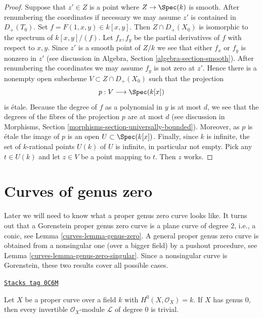 \begin{proof}
Suppose that $z' \in Z$ is a point where $Z \to \Spec(k)$ is smooth.
After renumbering the coordinates if necessary we may assume
$z'$ is contained in $D_+(T_0)$. Set $f = F(1, x, y) \in k[x, y]$.
Then $Z \cap D_+(X_0)$ is isomorphic to the spectrum of $k[x, y]/(f)$.
Let $f_x, f_y$ be the partial derivatives of $f$ with respect to
$x, y$. Since $z'$ is a smooth point of $Z/k$ we see that either
$f_x$ or $f_y$ is nonzero in $z'$ (see discussion in
Algebra, Section \ref{algebra-section-smooth}).
After renumbering the coordinates
we may assume $f_y$ is not zero at $z'$. Hence there is a nonempty
open subscheme $V \subset Z \cap D_{+}(X_0)$ such that the
projection
$$
p : V \longrightarrow \Spec(k[x])
$$
is \'etale. Because the degree of $f$ as a polynomial in $y$
is at most $d$, we see that the degrees of the fibres of the
projection $p$ are at most $d$ (see discussion in
Morphisms, Section \ref{morphisms-section-universally-bounded}).
Moreover, as $p$ is \'etale
the image of $p$ is an open $U \subset \Spec(k[x])$.
Finally, since $k$ is infinite, the set of $k$-rational points
$U(k)$ of $U$ is infinite, in particular not empty. Pick any
$t \in U(k)$ and let $z \in V$ be a point mapping to $t$.
Then $z$ works.
\end{proof}

\section{Curves of genus zero}
\label{curves-section-genus-zero}
Later we will need to know what a proper genus zero curve looks like.
It turns out that a Gorenstein proper genus zero curve is a plane
curve of degree $2$, i.e., a conic, see Lemma \ref{curves-lemma-genus-zero}.
A general proper genus zero curve is obtained from a nonsingular one
(over a bigger field) by a pushout procedure, see
Lemma \ref{curves-lemma-genus-zero-singular}.
Since a nonsingular curve is Gorenstein, these two results
cover all possible cases.

\begin{lemma}
\label{curves-lemma-genus-zero-pic}
\href{https://stacks.math.columbia.edu/tag/0C6M}{\texttt{Stacks tag 0C6M}}

Let $X$ be a proper curve over a field $k$ with $H^0(X, \mathcal{O}_X) = k$.
If $X$ has genus $0$, then every invertible $\mathcal{O}_X$-module
$\mathcal{L}$ of degree $0$ is trivial.
\end{lemma}

